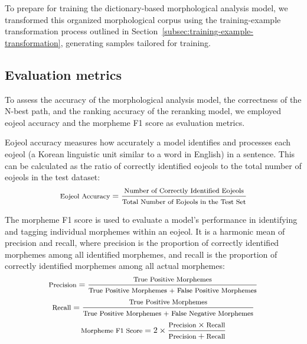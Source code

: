 \documentclass[AMS,STIX2COL]{WileyNJD-v2}
\begin{document}
    To prepare for training the dictionary-based morphological analysis model, we transformed this organized morphological corpus using the training-example transformation process outlined in Section~\ref{subsec:training-example-transformation}, generating samples tailored for training.

    \subsection{Evaluation metrics}\label{subsec:evaluation-metrics}

    To assess the accuracy of the morphological analysis model, the correctness of the N-best path, and the ranking accuracy of the reranking model, we employed eojeol accuracy and the morpheme F1 score as evaluation metrics.

    Eojeol accuracy measures how accurately a model identifies and processes each eojeol (a Korean linguistic unit similar to a word in English) in a sentence.
    This can be calculated as the ratio of correctly identified eojeols to the total number of eojeols in the test dataset:
    \vspace{1mm}
    \[
        \footnotesize
        \text{Eojeol Accuracy} = \frac{\text{Number of Correctly Identified Eojeols}}{\text{Total Number of Eojeols in the Test Set}}
    \]
    \vspace{0.5mm}

    The morpheme F1 score is used to evaluate a model's performance in identifying and tagging individual morphemes within an eojeol.
    It is a harmonic mean of precision and recall, where precision is the proportion of correctly identified morphemes among all identified morphemes, and recall is the proportion of correctly identified morphemes among all actual morphemes:
    \vspace{1mm}
    \[
        \footnotesize
        \text{Precision} = \frac{\text{True Positive Morphemes}}{\text{True Positive Morphemes + False Positive Morphemes}}
    \]
    \vspace{1mm}
    \[
        \footnotesize
        \text{Recall} = \frac{\text{True Positive Morphemes}}{\text{True Positive Morphemes + False Negative Morphemes}}
    \]
    \vspace{1mm}
    \[
        \footnotesize
        \text{Morpheme F1 Score} = 2 \times \frac{\text{Precision} \times \text{Recall}}{\text{Precision} + \text{Recall}}
    \]
    \vspace{0.5mm}
\end{document}
